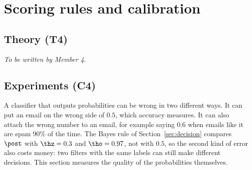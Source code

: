 \section{Scoring rules and calibration}
\label{sec:calibration}

\subsection{Theory (T4)}
\label{sec:t4}
\emph{To be written by Member 4.}

\subsection{Experiments (C4)}
\label{sec:c4}

A classifier that outputs probabilities can be wrong in two different ways. It can put an email on the
wrong side of $0.5$, which accuracy measures. It can also attach the wrong number to an email, for
example saying $0.6$ when emails like it are spam $90\%$ of the time. The Bayes rule of
Section~\ref{sec:decision} compares $\post$ with $\thz=0.3$ and $\tho=0.97$, not with $0.5$, so the second
kind of error also costs money: two filters with the same labels can still make different decisions. This
section measures the quality of the probabilities themselves.

